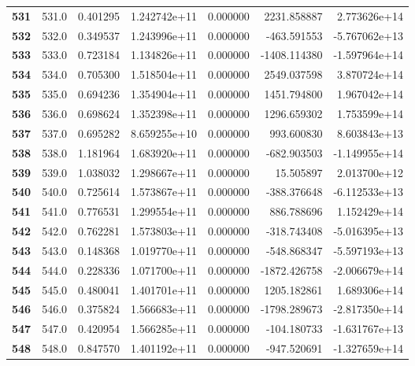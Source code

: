 \documentclass{report}[12pt]
\begin{document}
\begin{center}
\begin{tabular}{lrrrrrr}
\textbf{531 } &          531.0 &   0.401295 &  1.242742e+11 &    0.000000 &  2231.858887 &  2.773626e+14 \\
\textbf{532 } &          532.0 &   0.349537 &  1.243996e+11 &    0.000000 &  -463.591553 & -5.767062e+13 \\
\textbf{533 } &          533.0 &   0.723184 &  1.134826e+11 &    0.000000 & -1408.114380 & -1.597964e+14 \\
\textbf{534 } &          534.0 &   0.705300 &  1.518504e+11 &    0.000000 &  2549.037598 &  3.870724e+14 \\
\textbf{535 } &          535.0 &   0.694236 &  1.354904e+11 &    0.000000 &  1451.794800 &  1.967042e+14 \\
\textbf{536 } &          536.0 &   0.698624 &  1.352398e+11 &    0.000000 &  1296.659302 &  1.753599e+14 \\
\textbf{537 } &          537.0 &   0.695282 &  8.659255e+10 &    0.000000 &   993.600830 &  8.603843e+13 \\
\textbf{538 } &          538.0 &   1.181964 &  1.683920e+11 &    0.000000 &  -682.903503 & -1.149955e+14 \\
\textbf{539 } &          539.0 &   1.038032 &  1.298667e+11 &    0.000000 &    15.505897 &  2.013700e+12 \\
\textbf{540 } &          540.0 &   0.725614 &  1.573867e+11 &    0.000000 &  -388.376648 & -6.112533e+13 \\
\textbf{541 } &          541.0 &   0.776531 &  1.299554e+11 &    0.000000 &   886.788696 &  1.152429e+14 \\
\textbf{542 } &          542.0 &   0.762281 &  1.573803e+11 &    0.000000 &  -318.743408 & -5.016395e+13 \\
\textbf{543 } &          543.0 &   0.148368 &  1.019770e+11 &    0.000000 &  -548.868347 & -5.597193e+13 \\
\textbf{544 } &          544.0 &   0.228336 &  1.071700e+11 &    0.000000 & -1872.426758 & -2.006679e+14 \\
\textbf{545 } &          545.0 &   0.480041 &  1.401701e+11 &    0.000000 &  1205.182861 &  1.689306e+14 \\
\textbf{546 } &          546.0 &   0.375824 &  1.566683e+11 &    0.000000 & -1798.289673 & -2.817350e+14 \\
\textbf{547 } &          547.0 &   0.420954 &  1.566285e+11 &    0.000000 &  -104.180733 & -1.631767e+13 \\
\textbf{548 } &          548.0 &   0.847570 &  1.401192e+11 &    0.000000 &  -947.520691 & -1.327659e+14 \\

\end{tabular}
\end{center}
\end{document}
